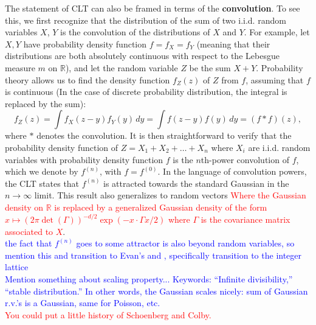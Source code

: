 \documentclass[11pt, letter]{book}
\renewcommand\det{\operatorname{det}}
\begin{document}
\noindent The statement of CLT can also be framed in terms of the \textbf{convolution}. To see this, we first recognize that the distribution of the sum of two i.i.d. random variables $X$, $Y$ is the convolution of the distributions of $X$ and $Y$. For example, let $X,Y$ have probability density function $f = f_X = f_Y$ (meaning that their distributions are both absolutely continuous with respect to the Lebesgue measure $m$ on $\mathbb{R}$), and let the random variable $Z$ be the sum $X + Y$. Probability theory allows us to find the density function $f_Z(z)$ of $Z$ from $f$, assuming that $f$ is continuous (In the case of discrete probability distribution, the integral is replaced by the sum):
\begin{equation*}
    f_Z(z) = \int  f_X(z-y) f_Y(y)\,dy = \int  f(z-y) f(y)\,dy = (f * f)(z),
\end{equation*}
where $*$ denotes the convolution. It is then straightforward to verify that the probability density function of $Z = X_1 + X_2 + \dots + X_n$ where $X_i$ are i.i.d. random variables with probability density function $f$ is the $n$th-power convolution of $f$, which we denote by $f^{(n)}$, with $f = f^{(0)}$. In the language of convolution powers, the CLT states that $f^{(n)}$ is attracted towards the standard Gaussian in the $n\to \infty$ limit. This result also generalizes to random vectors \textcolor{red}{Where the Gaussian density on $\mathbb{R}$ is replaced by a generalized Gaussian density of the form $x\mapsto (2\pi \det(\Gamma))^{-d/2}\exp(-x\cdot \Gamma x/2)$ where $\Gamma$ is the covariance matrix associated to $X$}.\\

\textcolor{blue}{the fact that $f^{(n)}$ goes to some attractor is also beyond random variables, so mention this and transition to Evan's \cite{randles_convolution_2015} and \cite{randles_convolution_2017}, specifically transition to the integer lattice}\\


\textcolor{blue}{Mention something about scaling property... Keywords: ``Infinite divisibility,'' ``stable distribution.'' In other words, the Gaussian scales nicely: sum of Gaussian r.v.'s is a Gaussian, same for Poisson, etc. }\\


\textcolor{red}{You could put a little history of Schoenberg and Colby.} 
\end{document}
